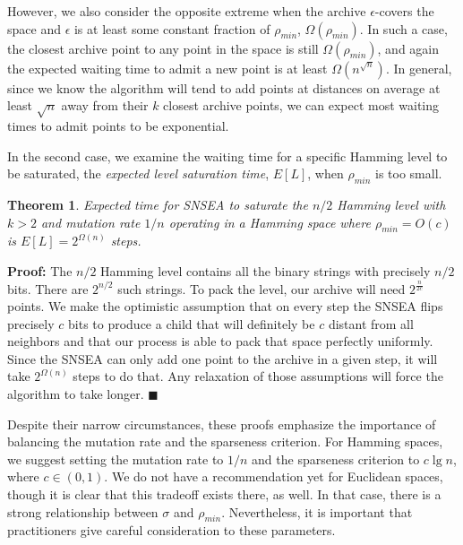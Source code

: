 \documentclass[twoside]{article}
\newtheorem{theorem}{Theorem}
\begin{document}
\vspace*{1ex}

However, we also consider the opposite extreme when the archive $\epsilon$-covers the space and $\epsilon$ is at least some constant fraction of $\rho_{min}$, $\Omega(\rho_{min})$.  In such a case, the closest archive point to any point in the space is still $\Omega(\rho_{min})$, and again the expected waiting time to admit a new point is at least $\Omega(n^{\sqrt{n}})$.  In general, since we know the algorithm will tend to add points at distances on average at least $\sqrt{n}$ away from their $k$ closest archive points, we can expect most waiting times to admit points to be exponential.

In the second case, we examine the waiting time for a specific Hamming level to be saturated, the \emph{expected level saturation time}, $E[L]$, when $\rho_{min}$ is too small.

\begin{theorem}
Expected time for SNSEA to saturate the $n/2$ Hamming level with $k>2$ and mutation rate $1/n$ operating in a Hamming space where $\rho_{min} = O(c)$ is $E[L] = 2^{\Omega(n)}$ steps.
\end{theorem}
\textbf{Proof:} The $n/2$ Hamming level contains all the binary strings with precisely $n/2$ bits.  There are $2^{n/2}$ such strings.  To pack the level, our archive will need $2^\frac{n}{2c}$ points.  We make the optimistic assumption that on every step the SNSEA flips precisely $c$ bits to produce a child that will definitely be $c$ distant from all neighbors and that our process is able to pack that space perfectly uniformly.  Since the SNSEA can only add one point to the archive in a given step, it will take $2^{\Omega(n)}$ steps to do that. Any relaxation of those assumptions will force the algorithm to take longer. $\blacksquare$

\vspace*{1ex}

Despite their narrow circumstances, these proofs emphasize the importance of balancing the mutation rate and the sparseness criterion.  For Hamming spaces, we suggest setting the mutation rate to $1/n$ and the sparseness criterion to $c\lg n$, where $c\in (0,1)$.  We do not have a recommendation yet for Euclidean spaces, though it is clear that this tradeoff exists there, as well.  In that case, there is a strong relationship between $\sigma$ and $\rho_{min}$.  Nevertheless, it is important that practitioners give careful consideration to these parameters.
\end{document}
